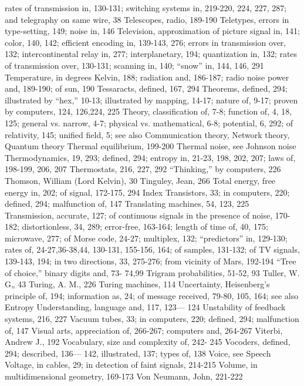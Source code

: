 {{{{{{{{{{{{{{{rates of transmission in, 130-131;
switching systems in, 219-220, 224,
227, 287; and telegraphy on same
wire, 38
Telescopes, radio, 189-190
Teletypes, errors in type-setting, 149;
noise in, 146
Television, approximation of picture
signal in, 141; color, 140, 142; efficient
encoding in, 139-143, 276;
errors in transmission over, 132;
intercontinental relay in, 277; interplanetary,
194; quantization in,
132; rates of transmission over,
130-131; scanning in, 140; “snow”
in, 144, 146, 291
Temperature, in degrees Kelvin, 188;
radiation and, 186-187; radio noise
power and, 189-190; of sun, 190
Tessaracts, defined, 167, 294
Theorems, defined, 294; illustrated by
“hex,” 10-13; illustrated by mapping,
14-17; nature of, 9-17; proven
by computers, 124, 126,224, 225
Theory, classification of, 7-8; function
of, 4, 18, 125; general vs. narrow,
4-7; physical vs. mathematical,
6-8; potential, 6, 292; of relativity,
145; unified field, 5; see also Communication
theory, Network theory,
Quantum theory
Thermal equilibrium, 199-200
Thermal noise, see Johnson noise
Thermodynamics, 19, 293; defined, 294;
entropy in, 21-23, 198, 202, 207;
laws of, 198-199, 206, 207
Thermostats, 216, 227, 292
“Thinking,” by computers, 226
Thomson, William (Lord Kelvin), 30
Tinguley, Jean, 266
Total energy, free energy in, 202; of
signal, 172-175, 294
Index
Transistors, 33; in computers, 220; defined,
294; malfunction of, 147
Translating machines, 54, 123, 225
Transmission, accurate, 127; of continuous
signals in the presence of noise,
170-182; distortionless, 34, 289;
error-free, 163-164; length of time
of, 40, 175; microwave, 277; of
Morse code, 24-27; multiplex, 132;
“predictors” in, 129-130; rates of,
24-27,36-38,44, 130-131, 155-156,
164; of samples, 131-132; of TV
signals, 139-143, 194; in two directions,
33, 275-276; from vicinity of
Mars, 192-194
“Tree of choice,” binary digits and, 73-
74,99
Trigram probabilities, 51-52, 93
Tuller, W. G„ 43
Turing, A. M., 226
Turing machines, 114
Uncertainty, Heisenberg’s principle of,
194; information as, 24; of message
received, 79-80, 105, 164; see also
Entropy
Understanding, language and, 117, 123—
124
Unstability of feedback systems, 216,
227
Vacuum tubes, 33; in computers, 220;
defined, 294; malfunction of, 147
Visual arts, appreciation of, 266-267;
computers and, 264-267
Viterbi, Andrew J., 192
Vocabulary, size and complexity of, 242-
245
Vocoders, defined, 294; described, 136—
142, illustrated, 137; types of, 138
Voice, see Speech
Voltage, in cables, 29; in detection of
faint signals, 214-215
Volume, in multidimensional geometry,
169-173
Von Neumann, John, 221-222
}}}}}}}}}}}}}}}
